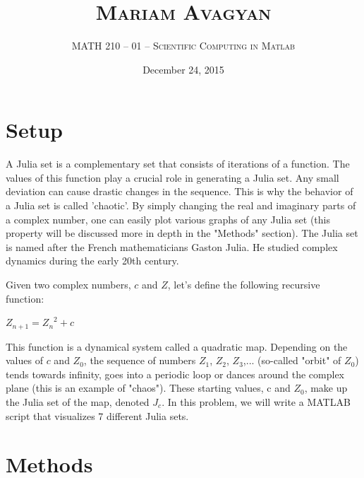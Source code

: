 \documentclass[11pt]{article}
\title{\textsc{Mariam Avagyan}}
\author{\Large{MATH 210 -- 01 -- \textsc{Scientific Computing in Matlab}}}
\date{December 24, 2015}
\begin{document}
\maketitle
\pagebreak




\section{Setup}

A Julia set is a complementary set that consists of iterations of a function. The values of this function play a crucial role in generating a Julia set. Any small deviation can cause drastic changes in the sequence. This is why the behavior of a Julia set is called 'chaotic'. By simply changing the real and imaginary parts of a complex number, one can easily plot various graphs of any Julia set (this property will be discussed more in depth in the "Methods" section).
The Julia set is named after the French mathematicians Gaston Julia. He studied complex dynamics during the early 20th century.

Given two complex numbers, $c$ and $Z$, let's define the following recursive function:
   
\begin{center}
$Z_{n+1} = {Z_n}^2+c$
\end{center}

This function is a dynamical system called a quadratic map. Depending on the values of $c$ and $Z_0$, the sequence of numbers $Z_1$, $Z_2$, $Z_3$,... (so-called "orbit" of $Z_0$) tends towards infinity, goes into a periodic loop or dances around the complex plane (this is an example of "chaos"). These starting values, c and $Z_0$, make up the Julia set of the map, denoted $J_c$.
In this problem, we will write a MATLAB script that visualizes 7 different Julia sets.

\section{Methods}
\end{document}
